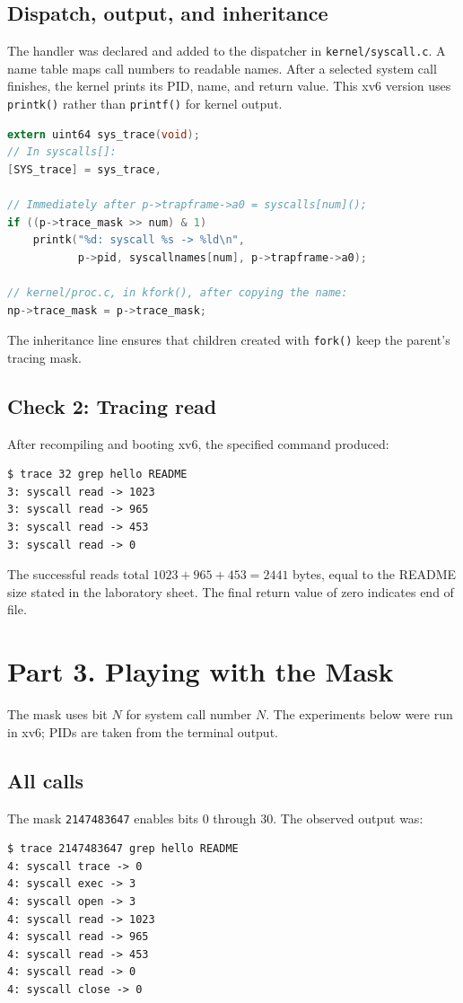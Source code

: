 \documentclass[12pt,a4paper]{article}
\begin{document}
\subsection{Dispatch, output, and inheritance}
The handler was declared and added to the dispatcher in \texttt{kernel/syscall.c}. A name table maps call numbers to readable names. After a selected system call finishes, the kernel prints its PID, name, and return value. This xv6 version uses \texttt{printk()} rather than \texttt{printf()} for kernel output.
\begin{lstlisting}[language=C]
extern uint64 sys_trace(void);
// In syscalls[]:
[SYS_trace] = sys_trace,

// Immediately after p->trapframe->a0 = syscalls[num]();
if ((p->trace_mask >> num) & 1)
    printk("%d: syscall %s -> %ld\n",
           p->pid, syscallnames[num], p->trapframe->a0);

// kernel/proc.c, in kfork(), after copying the name:
np->trace_mask = p->trace_mask;
\end{lstlisting}
The inheritance line ensures that children created with \texttt{fork()} keep the parent's tracing mask.
\subsection{Check 2: Tracing read}
After recompiling and booting xv6, the specified command produced:
\begin{lstlisting}
$ trace 32 grep hello README
3: syscall read -> 1023
3: syscall read -> 965
3: syscall read -> 453
3: syscall read -> 0
\end{lstlisting}
The successful reads total \(1023+965+453=2441\) bytes, equal to the README size stated in the laboratory sheet. The final return value of zero indicates end of file.

\section{Part 3. Playing with the Mask}
The mask uses bit \(N\) for system call number \(N\). The experiments below were run in xv6; PIDs are taken from the terminal output.
\subsection{All calls}
The mask \texttt{2147483647} enables bits 0 through 30. The observed output was:
\begin{lstlisting}
$ trace 2147483647 grep hello README
4: syscall trace -> 0
4: syscall exec -> 3
4: syscall open -> 3
4: syscall read -> 1023
4: syscall read -> 965
4: syscall read -> 453
4: syscall read -> 0
4: syscall close -> 0
\end{lstlisting}
\end{document}
